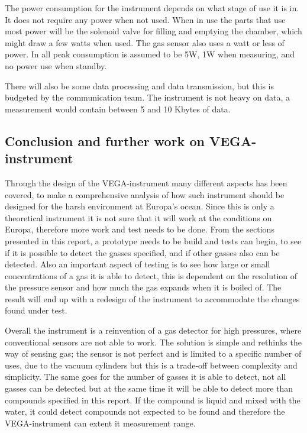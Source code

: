 The power consumption for the instrument depends on what stage of use it is in. It does not require any power when not used. When in use the parts that use most power will be the solenoid valve for filling and emptying the chamber, which might draw a few watts when used. The gas sensor also uses a watt or less of power. In all peak consumption is assumed to be 5W, 1W when measuring, and no power use when standby.

There will also be some data processing and data transmission, but this is budgeted by the communication team. The instrument is not heavy on data, a measurement would contain between 5 and 10 Kbytes of data.

\subsection{Conclusion and further work on VEGA-instrument}

Through the design of the VEGA-instrument many different aspects has been covered, to make a comprehensive analysis of how such instrument should be designed for the harsh environment at Europa's ocean. Since this is only a theoretical instrument it is not sure that it will work at the conditions on Europa, therefore more work and test needs to be done. From the sections presented in this report, a prototype needs to be build and tests can begin, to see if it is possible to detect the gasses specified, and if other gasses also can be detected. Also an important aspect of testing is to see how large or small concentrations of a gas it is able to detect, this is dependent on the resolution of the pressure sensor and how much the gas expands when it is boiled of. The result will end up with a redesign of the instrument to accommodate the changes found under test.

Overall the instrument is a reinvention of a gas detector for high pressures, where conventional sensors are not able to work. The solution is simple and rethinks the way of sensing gas; the sensor is not perfect and is limited to a specific number of uses, due to the vacuum cylinders but this is a trade-off between complexity and simplicity. The same goes for the number of gasses it is able to detect, not all gasses can be detected but at the same time it will be able to detect more than compounds specified in this report. If the compound is liquid and mixed with the water, it could detect compounds not expected to be found and therefore the VEGA-instrument can extent it measurement range.
